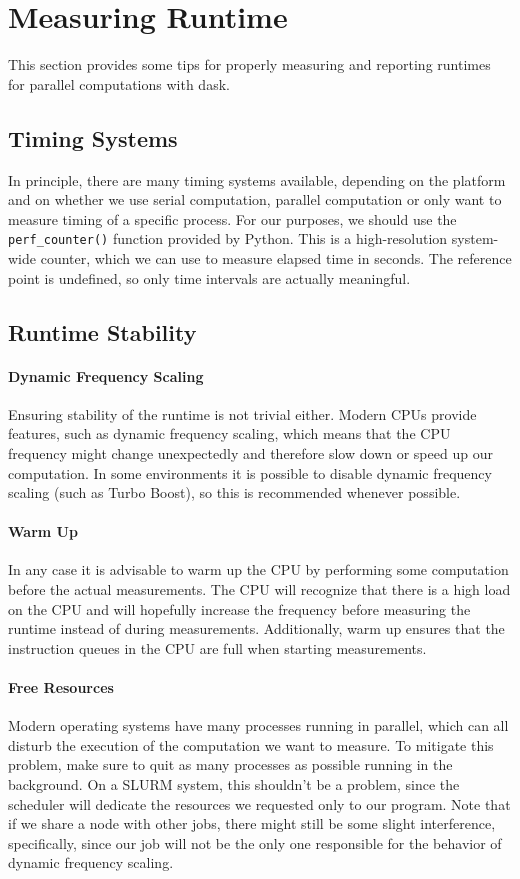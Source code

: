 \section{Measuring Runtime}

This section provides some tips for properly measuring and reporting runtimes for parallel computations with dask.

\subsection{Timing Systems}

In principle, there are many timing systems available, depending on the platform and on whether we use serial computation, parallel computation or only want to measure timing of a specific process.
For our purposes, we should use the \lstinline{perf_counter()} function provided by Python.
This is a high-resolution system-wide counter, which we can use to measure elapsed time in seconds.
The reference point is undefined, so only time intervals are actually meaningful.

\subsection{Runtime Stability}

\paragraph{Dynamic Frequency Scaling}
Ensuring stability of the runtime is not trivial either.
Modern CPUs provide features, such as dynamic frequency scaling, which means that the CPU frequency might change unexpectedly and therefore slow down or speed up our computation.
In some environments it is possible to disable dynamic frequency scaling (such as Turbo Boost), so this is recommended whenever possible.

\paragraph{Warm Up}
In any case it is advisable to warm up the CPU by performing some computation before the actual measurements.
The CPU will recognize that there is a high load on the CPU and will hopefully increase the frequency before measuring the runtime instead of during measurements.
Additionally, warm up ensures that the instruction queues in the CPU are full when starting measurements.

\paragraph{Free Resources}
Modern operating systems have many processes running in parallel, which can all disturb the execution of the computation we want to measure.
To mitigate this problem, make sure to quit as many processes as possible running in the background.
On a SLURM system, this shouldn't be a problem, since the scheduler will dedicate the resources we requested only to our program.
Note that if we share a node with other jobs, there might still be some slight interference, specifically, since our job will not be the only one responsible for the behavior of dynamic frequency scaling.

